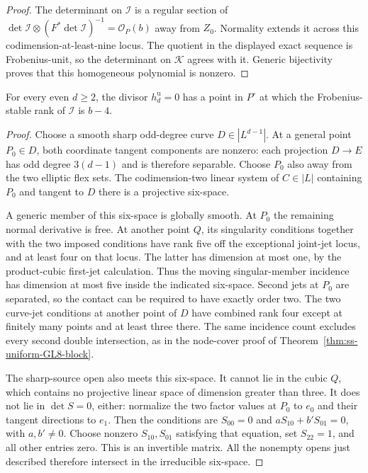 \begin{proof}
The determinant on $\mathcal I$ is a regular section of
$\det\mathcal I\otimes(F^*\det\mathcal I)^{-1}
=\mathcal O_P(b)$ away from $Z_0$.
Normality extends it across this codimension-at-least-nine locus.
The quotient in the displayed exact sequence is Frobenius-unit,
so the determinant on $\mathcal K$ agrees with it. Generic
bijectivity proves that this homogeneous polynomial is nonzero.
\end{proof}

\begin{lemma}
\label{lem:ss-even-one-loss-point}
For every even $d\ge2$, the divisor $h_d^{\mathrm u}=0$ has a
point in $P^\circ$ at which the Frobenius-stable rank of
$\mathcal I$ is $b-4$.
\end{lemma}

\begin{proof}
Choose a smooth sharp odd-degree curve $D\in|L^{d-1}|$.
At a general point $P_0\in D$, both coordinate tangent components
are nonzero: each projection $D\to E$ has odd degree $3(d-1)$
and is therefore separable. Choose $P_0$ also away from the two
elliptic flex sets. The codimension-two linear system of
$C\in|L|$ containing $P_0$ and tangent to $D$ there is a
projective six-space.

A generic member of this six-space is globally smooth. At $P_0$
the remaining normal derivative is free. At another point $Q$,
its singularity conditions together with the two imposed
conditions have rank five off the exceptional joint-jet locus,
and at least four on that locus. The latter has dimension at
most one, by the product-cubic first-jet calculation. Thus the
moving singular-member incidence has dimension at most five
inside the indicated six-space. Second jets at $P_0$ are
separated, so the contact can be required to have exactly order
two. The two curve-jet conditions at another point of $D$ have
combined rank four except at finitely many points and at least
three there. The same incidence count excludes every second
double intersection, as in the node-cover proof of
Theorem~\ref{thm:ss-uniform-GL8-block}.

The sharp-source open also meets this six-space. It cannot lie
in the cubic $Q$, which contains no projective linear space of
dimension greater than three. It does not lie in $\det S=0$,
either: normalize the two factor values at $P_0$ to $e_0$ and
their tangent directions to $e_1$. Then the conditions are
$S_{00}=0$ and $aS_{10}+b'S_{01}=0$, with $a,b'\ne0$.
Choose nonzero $S_{10},S_{01}$ satisfying that equation,
set $S_{22}=1$, and all other entries zero. This is an
invertible matrix. All the nonempty opens just described
therefore intersect in the irreducible six-space.


\end{proof}
